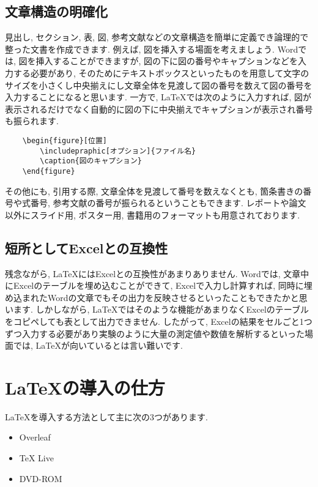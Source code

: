 \documentclass[10pt,a4paper]{jsarticle}
\begin{document}
\subsection{文章構造の明確化}
見出し, セクション, 表, 図, 参考文献などの文章構造を簡単に定義でき論理的で整った文書を作成できます. 例えば, 図を挿入する場面を考えましょう. Wordでは, 図を挿入することができますが, 図の下に図の番号やキャプションなどを入力する必要があり, そのためにテキストボックスといったものを用意して文字のサイズを小さくし中央揃えにし文章全体を見渡して図の番号を数えて図の番号を入力することになると思います. 一方で, \LaTeX では次のように入力すれば, 図が表示されるだけでなく自動的に図の下に中央揃えでキャプションが表示され番号も振られます.  
\begin{verbatim}
    \begin{figure}[位置]
        \includepraphic[オプション]{ファイル名}
        \caption{図のキャプション}
    \end{figure}
\end{verbatim}
その他にも, 引用する際, 文章全体を見渡して番号を数えなくとも, 箇条書きの番号や式番号, 参考文献の番号が振られるということもできます. レポートや論文以外にスライド用, ポスター用, 書籍用のフォーマットも用意されております. 
\subsection{短所としてExcelとの互換性}
残念ながら, \LaTeX にはExcelとの互換性があまりありません. Wordでは, 文章中にExcelのテーブルを埋め込むことができて, Excelで入力し計算すれば, 同時に埋め込まれたWordの文章でもその出力を反映させるといったこともできたかと思います. しかしながら, \LaTeX ではそのような機能があまりなくExcelのテーブルをコピペしても表として出力できません. したがって, Excelの結果をセルごと1つずつ入力する必要があり実験のように大量の測定値や数値を解析するといった場面では, \LaTeX が向いているとは言い難いです. 
\section{\LaTeX の導入の仕方}
\LaTeX を導入する方法として主に次の3つがあります. 
\begin{itemize}
    \item Overleaf
    \item TeX Live
    \item DVD-ROM
\end{itemize}
\end{document}
